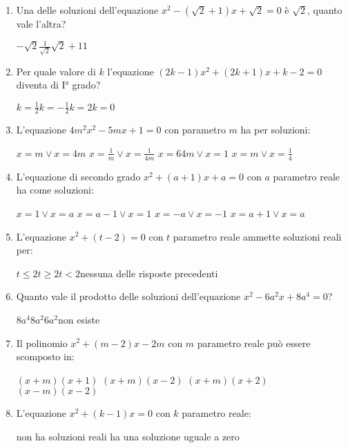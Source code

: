 \begin{esercizio}[\Ast]
\begin{enumerate}
	\item Una delle soluzioni dell'equazione $x^{2}-(\sqrt{2} + 1) x + \sqrt{2} = 0$ è $\sqrt{2}$, quanto vale l'altra?

\boxA\quad $ - \sqrt{2} $\qquad \boxB\quad $\frac{1}{\sqrt{2}}$\qquad\boxC\quad $\sqrt{2} + 1$\qquad\boxD\quad $1$

	\item Per quale valore di $ k $ l'equazione $(2k-1) x^{2} + (2k + 1) x + k-2 = 0$ diventa di I° grado?

\boxA\quad $k = \frac{1}{2}$\qquad \boxB\quad $k =-\frac{1}{2}$\qquad\boxC\quad $k = 2$\qquad\boxD\quad $k = 0$

	\item L'equazione $4m^{2} x^{2}-5mx + 1 = 0$ con parametro $ m $ ha per soluzioni:

\boxA\; $x = m \vee x = 4m$\quad \boxB\; $x = \frac{1}{m} \vee x = \frac{1}{4m}$\quad\boxC\; $x = 64m \vee x = 1$\quad\boxD\; $x = m \vee x = \frac{1}{4}$

	\item L’equazione di secondo grado $x^{2} + (a + 1) x + a = 0$ con $ a $ parametro reale ha come soluzioni:

\boxA\; $x = 1 \vee x = a$\quad \boxB\; $x = a-1 \vee x = 1$\quad\boxC\; $x =-a \vee x =-1$\quad\boxD\; $x = a + 1 \vee x = a$

	\item L’equazione $x^{2} + (t-2) = 0$ con $ t $ parametro reale ammette soluzioni reali per:

\boxA\quad $t \leq 2$\qquad \boxB\quad $t \geq 2$\qquad\boxC\quad $t < 2$\qquad\boxD\quad nessuna delle risposte precedenti

	\item Quanto vale il prodotto delle soluzioni dell'equazione $x^{2}-6a^{2} x + 8a^{4} = 0$?

\boxA\quad $8a^{4}$\qquad \boxB\quad $8a^{2}$\qquad\boxC\quad $6a^{2}$\qquad\boxD\quad non esiste

	\item Il polinomio $x^{2} + (m-2) x-2m$ con $ m $ parametro reale può essere scomposto in:

\boxA\; $(x + m) (x + 1)$\quad\boxB\; $(x + m) (x-2)$\quad\boxC\; $(x + m) (x + 2)$\quad\boxD\; $(x-m) (x-2)$

	\item L’equazione $x^{2} + (k-1) x = 0$ con $ k $ parametro reale:

\boxA\; non ha soluzioni reali\quad\boxB\; ha una soluzione uguale a zero


\end{enumerate}
\end{esercizio}
